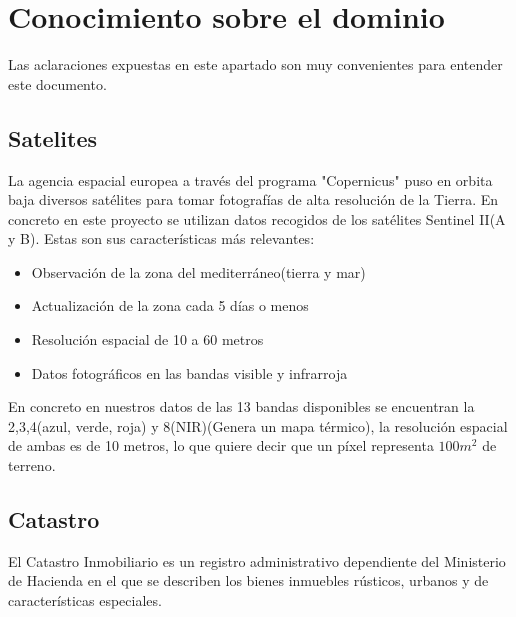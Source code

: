 \section{Conocimiento sobre el dominio}
Las aclaraciones expuestas en este apartado son muy convenientes para entender este documento.
\subsection{Satelites}
\par
La agencia espacial europea a través del programa "Copernicus" puso en orbita baja diversos satélites para tomar fotografías de alta resolución de la Tierra. En concreto en este proyecto se utilizan datos recogidos de los satélites Sentinel II(A y B)\cite{sentinel}. Estas son sus características más relevantes:
{\begin{itemize}
    \item Observación de la zona del mediterráneo(tierra y mar)
    \item Actualización de la zona cada 5 días o menos
    \item Resolución espacial de 10 a 60 metros
    \item Datos fotográficos en las bandas visible y infrarroja
\end{itemize}
}
En concreto en nuestros datos de las 13 bandas disponibles se encuentran la 2,3,4(azul, verde, roja) y 8(NIR)(Genera un mapa térmico)\cite{NIR}, la resolución espacial de ambas es de 10 metros, lo que quiere decir que un píxel representa $100m^{2}$ de terreno\cite{sateliteDescriptionParams}.

\subsection{Catastro}
El Catastro Inmobiliario es un registro administrativo dependiente del Ministerio de Hacienda en el que se describen los bienes inmuebles rústicos, urbanos y de características especiales.
\vfill